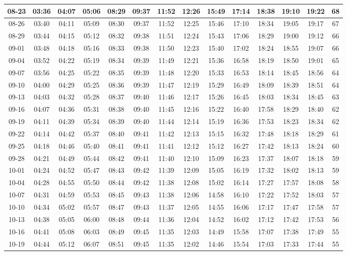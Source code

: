 \begin{footnotesize}
\begin{longtable}{c | c | c | c | c | c | c | c | c | c | c | c | c | c}
		08-23&03:36&04:07&05:06&08:29&09:37&11:52&12:26&15:49&17:14&18:38&19:10&19:22&68\\\hline
		08-26&03:40&04:11&05:09&08:30&09:37&11:52&12:25&15:46&17:10&18:34&19:05&19:17&67\\\hline
		08-29&03:44&04:15&05:12&08:32&09:38&11:51&12:24&15:43&17:06&18:29&19:00&19:12&66\\\hline
		09-01&03:48&04:18&05:16&08:33&09:38&11:50&12:23&15:40&17:02&18:24&18:55&19:07&66\\\hline
		09-04&03:52&04:22&05:19&08:34&09:39&11:49&12:21&15:36&16:58&18:19&18:50&19:01&65\\\hline
		09-07&03:56&04:25&05:22&08:35&09:39&11:48&12:20&15:33&16:53&18:14&18:45&18:56&64\\\hline
		09-10&04:00&04:29&05:25&08:36&09:39&11:47&12:19&15:29&16:49&18:09&18:39&18:51&64\\\hline
		09-13&04:03&04:32&05:28&08:37&09:40&11:46&12:17&15:26&16:45&18:03&18:34&18:45&63\\\hline
		09-16&04:07&04:36&05:31&08:38&09:40&11:45&12:16&15:22&16:40&17:58&18:29&18:40&62\\\hline
		09-19&04:11&04:39&05:34&08:39&09:40&11:44&12:14&15:19&16:36&17:53&18:23&18:34&62\\\hline
		09-22&04:14&04:42&05:37&08:40&09:41&11:42&12:13&15:15&16:32&17:48&18:18&18:29&61\\\hline
		09-25&04:18&04:46&05:40&08:41&09:41&11:41&12:12&15:12&16:27&17:42&18:13&18:24&60\\\hline
		09-28&04:21&04:49&05:44&08:42&09:41&11:40&12:10&15:09&16:23&17:37&18:07&18:18&59\\\hline
		10-01&04:24&04:52&05:47&08:43&09:42&11:39&12:09&15:05&16:19&17:32&18:02&18:13&59\\\hline
		10-04&04:28&04:55&05:50&08:44&09:42&11:38&12:08&15:02&16:14&17:27&17:57&18:08&58\\\hline
		10-07&04:31&04:59&05:53&08:45&09:43&11:38&12:06&14:58&16:10&17:22&17:52&18:03&57\\\hline
		10-10&04:34&05:02&05:57&08:47&09:43&11:37&12:05&14:55&16:06&17:17&17:47&17:58&57\\\hline
		10-13&04:38&05:05&06:00&08:48&09:44&11:36&12:04&14:52&16:02&17:12&17:42&17:53&56\\\hline
		10-16&04:41&05:08&06:03&08:49&09:45&11:35&12:03&14:49&15:58&17:07&17:38&17:49&55\\\hline
		10-19&04:44&05:12&06:07&08:51&09:45&11:35&12:02&14:46&15:54&17:03&17:33&17:44&55\\\hline

\end{longtable}
\end{footnotesize}
